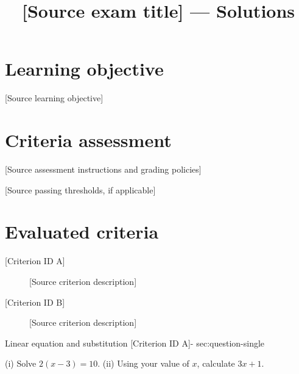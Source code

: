 \makeatletter
{}
\makeatother


\usepackage{varwidth}
\newcommand{\CreditDescription}[1]{\begin{varwidth}[t]{.72\linewidth}\raggedright#1\end{varwidth}}

\title{[Source exam title] --- Solutions}
\author{}
\date{}


\maketitle

\setcounter{tocdepth}{1}
\label{toc}
\tableofcontents

\section*{Learning objective}
[Source learning objective]

\section*{Criteria assessment}
[Source assessment instructions and grading policies]

[Source passing thresholds, if applicable]

\section*{Evaluated criteria}
\begin{description}
  \item[{[Criterion ID A]}] [Source criterion description]
  \item[{[Criterion ID B]}] [Source criterion description]
\end{description}

\sectionScored
  {Linear equation and substitution}
  {[Criterion ID A]-}
  {sec:question-single}

(i) Solve $2(x-3)=10$. 
(ii) Using your value of $x$, calculate $3x+1$. 

